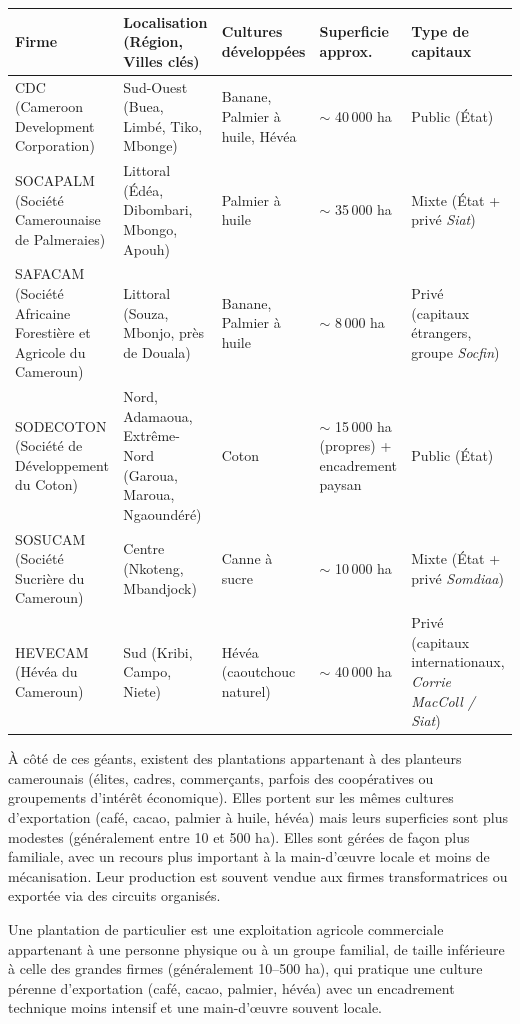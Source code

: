 \documentclass[11pt]{article}
\newcounter{popsec}
\newcounter{popsub}
\newcommand{\courssub}[1]{%
  \stepcounter{popsub}%
  \par\vspace{9pt}\noindent{\popxbold\fontsize{11.5}{13}\selectfont\color{popink}{\color{poporange}\thepopsec.\thepopsub}\hspace{6pt}#1}\par\nopagebreak\vspace{4pt}
}
\begin{document}
\begin{center}
\begin{tabularx}{\linewidth}{|l|X|X|X|l|}
\hline
\rowcolor{popblueL}
\textbf{Firme} & \textbf{Localisation (Région, Villes clés)} & \textbf{Cultures développées} & \textbf{Superficie approx.} & \textbf{Type de capitaux} \\ \hline
CDC (Cameroon Development Corporation) & Sud-Ouest (Buea, Limbé, Tiko, Mbonge) & Banane, Palmier à huile, Hévéa & $\sim$ 40\,000 ha & Public (État) \\ \hline
SOCAPALM (Société Camerounaise de Palmeraies) & Littoral (Édéa, Dibombari, Mbongo, Apouh) & Palmier à huile & $\sim$ 35\,000 ha & Mixte (État + privé \emph{Siat}) \\ \hline
SAFACAM (Société Africaine Forestière et Agricole du Cameroun) & Littoral (Souza, Mbonjo, près de Douala) & Banane, Palmier à huile & $\sim$ 8\,000 ha & Privé (capitaux étrangers, groupe \emph{Socfin}) \\ \hline
SODECOTON (Société de Développement du Coton) & Nord, Adamaoua, Extrême-Nord (Garoua, Maroua, Ngaoundéré) & Coton & $\sim$ 15\,000 ha (propres) + encadrement paysan & Public (État) \\ \hline
SOSUCAM (Société Sucrière du Cameroun) & Centre (Nkoteng, Mbandjock) & Canne à sucre & $\sim$ 10\,000 ha & Mixte (État + privé \emph{Somdiaa}) \\ \hline
HEVECAM (Hévéa du Cameroun) & Sud (Kribi, Campo, Niete) & Hévéa (caoutchouc naturel) & $\sim$ 40\,000 ha & Privé (capitaux internationaux, \emph{Corrie MacColl / Siat}) \\ \hline
\end{tabularx}
\end{center}

\courssub{Les plantations des particuliers}

À côté de ces géants, existent des plantations appartenant à des planteurs camerounais (élites, cadres, commerçants, parfois des coopératives ou groupements d'intérêt économique). Elles portent sur les mêmes cultures d'exportation (café, cacao, palmier à huile, hévéa) mais leurs superficies sont plus modestes (généralement entre 10 et 500 ha). Elles sont gérées de façon plus familiale, avec un recours plus important à la main-d'œuvre locale et moins de mécanisation. Leur production est souvent vendue aux firmes transformatrices ou exportée via des circuits organisés.

\begin{definition}
Une plantation de particulier est une exploitation agricole commerciale appartenant à une personne physique ou à un groupe familial, de taille inférieure à celle des grandes firmes (généralement 10--500 ha), qui pratique une culture pérenne d'exportation (café, cacao, palmier, hévéa) avec un encadrement technique moins intensif et une main-d'œuvre souvent locale.
\end{definition}
\end{document}
